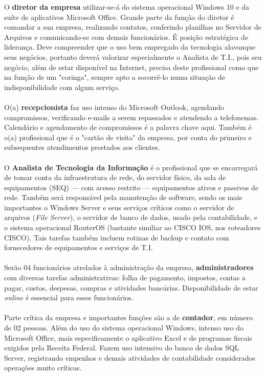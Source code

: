 \documentclass[	DIV=calc,%
							paper=a4,%
							fontsize=12pt,%
							onecolumn]{scrartcl}	 					%
\begin{document}
O \textbf{diretor da empresa} utilizar-se-á do sistema operacional Windows 10 e da suíte de aplicativos Microsoft Office. Grande parte da função do diretor é comandar a sua empresa, realizando contatos, conferindo planilhas no Servidor de Arquivos e comunicando-se com demais funcionários. É posição estratégica de liderança. Deve compreender que o uso bem empregado da tecnologia alavanque seus negócios, portanto deverá valorizar especialmente o Analista de T.I., pois seu negócio, além de estar disponível na Internet, precisa deste profissional como que na função de um "coringa", sempre apto a socorrê-lo numa situação de indisponibilidade com algum serviço.
\\ \\
O(a) \textbf{recepcionista} faz uso intenso do Microsoft Outlook, agendando compromissos, verificando e-mails a serem repassados e atendendo a telefonemas. Calendário e agendamento de compromissos é a palavra chave aqui. Também é o(a) profissional que é o "cartão de visita" da empresa, por conta do primeiro e subsequentes atendimentos prestados aos clientes.
\\ \\
O \textbf{Analista de Tecnologia da Informação} é o profissional que se encarregará de tomar conta da infraestrutura de rede, do servidor físico, da sala de equipamentos (SEQ) --- com acesso restrito --- equipamentos ativos e passivos de rede. Também será responsável pela manutenção de software, sendo os mais importantes o Windows Server e seus serviços críticos como o servidor de arquivos (\textit{File Server}), o servidor de banco de dados, usado pela contabilidade, e o sistema operacional RouterOS (bastante similiar ao CISCO IOS, nos roteadores CISCO). Tais tarefas também incluem rotinas de backup e contato com fornecedores de equipamentos e serviços de T.I.
\\ \\
Serão 04 funcionários atrelados à administração da empresa, \textbf{administradores} com diversas tarefas administrativas: folha de pagamento, impostos, contas a pagar, custos, despesas, compras e atividades bancárias. Disponibilidade de estar \textit{online} é essencial para esses funcionários.
\\ \\
Parte crítica da empresa e importantes funções são a de \textbf{contador}, em número de 02 pessoas. Além do uso do sistema operacional Windows, intenso uso do Microsoft Office, mais especificamente o aplicativo Excel e de programas fiscais exigidos pela Receita Federal. Fazem uso intensivo do banco de dados SQL Server, registrando empenhos e demais atividades de contabilidade considerados operações muito críticas.
\end{document}
